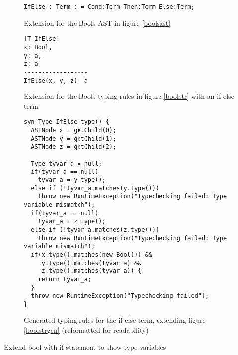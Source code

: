 \documentclass[nofilelist]{cslthse-msc}
\begin{document}
\begin{figure}[h]
\begin{lstlisting}[]
IfElse : Term ::= Cond:Term Then:Term Else:Term;
\end{lstlisting}
  \caption{Extension for the Bools AST in figure \ref{boolsast}}
  \label{ifelseast}
\end{figure}
\begin{figure}[h]
\begin{lstlisting}[]
[T-IfElse]
x: Bool,
y: a,
z: a
------------------
IfElse(x, y, z): a
\end{lstlisting}
  \caption{Extension for the Bools typing rules in figure \ref{boolstr} with an if-else term}
  \label{ifelsetr}
\end{figure}
\begin{figure}[h]
\begin{lstlisting}[language=jrag]
syn Type IfElse.type() {
  ASTNode x = getChild(0);
  ASTNode y = getChild(1);
  ASTNode z = getChild(2);

  Type tyvar_a = null;
  if(tyvar_a == null)
    tyvar_a = y.type();
  else if (!tyvar_a.matches(y.type()))
    throw new RuntimeException("Typechecking failed: Type variable mismatch");
  if(tyvar_a == null)
    tyvar_a = z.type();
  else if (!tyvar_a.matches(z.type()))
    throw new RuntimeException("Typechecking failed: Type variable mismatch");
  if(x.type().matches(new Bool()) &&
     y.type().matches(tyvar_a) &&
     z.type().matches(tyvar_a)) {
    return tyvar_a;
  }
  throw new RuntimeException("Typechecking failed");
}
\end{lstlisting}
  \caption{Generated typing rules for the if-else term, extending figure \ref{boolstrgen} (reformatted for readability)}
  \label{ifelsetrgen}
\end{figure}

%
Extend bool with if-statement to show type variables
\end{document}

